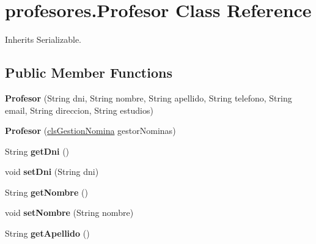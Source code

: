 \hypertarget{classprofesores_1_1_profesor}{}\section{profesores.\+Profesor Class Reference}
\label{classprofesores_1_1_profesor}


Inherits Serializable.

\subsection*{Public Member Functions}
\begin{DoxyCompactItemize}
\item 
\mbox{\label{classprofesores_1_1_profesor_a09102d5605c7a4b473bae9c8800d001e}} 
{\bfseries Profesor} (String dni, String nombre, String apellido, String telefono, String email, String direccion, String estudios)
\item 
\mbox{\label{classprofesores_1_1_profesor_a1bb3f95d668634d3704c53e4c936ee7f}} 
{\bfseries Profesor} (\hyperlink{classprofesores_1_1cls_gestion_nomina}{cls\+Gestion\+Nomina} gestor\+Nominas)
\item 
\mbox{\label{classprofesores_1_1_profesor_a24c3ed46cc814c63c30db2561fa65ae4}} 
String {\bfseries get\+Dni} ()
\item 
\mbox{\label{classprofesores_1_1_profesor_af69947a135f5fc8d310b3b55e57452a2}} 
void {\bfseries set\+Dni} (String dni)
\item 
\mbox{\label{classprofesores_1_1_profesor_a43d9d0bb886f1015065b9f596c26fd76}} 
String {\bfseries get\+Nombre} ()
\item 
\mbox{\label{classprofesores_1_1_profesor_af3d38cfcf698a61523fc007d25c6ecbf}} 
void {\bfseries set\+Nombre} (String nombre)
\item 
\mbox{\label{classprofesores_1_1_profesor_a93b6dbdf1e3a1767d89534bc56f53d2d}} 
String {\bfseries get\+Apellido} ()
\item 

\end{DoxyCompactItemize}
